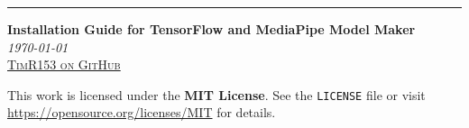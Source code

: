 \documentclass[12pt,a4paper]{article}
\begin{document}
\begin{titlepage} 
	
	\raggedleft 
	
	\rule{1pt}{\textheight}
	\hspace{0.05\textwidth}
  \parbox[b]{0.75\textwidth}{
    {\raggedright
      {\Huge\bfseries \nohyphens{Installation Guide for TensorFlow and MediaPipe Model Maker}}\\[2\baselineskip]
      {\large\textit{\today}}\\[4\baselineskip]
      {\Large\textsc{\href{https://github.com/TimR153}{TimR153 on GitHub}}}
      
      \vspace{0.5\textheight}
      
      {\noindent This work is licensed under the \textbf{MIT License}.  
      See the \texttt{LICENSE} file or visit \url{https://opensource.org/licenses/MIT} for details.}\\[\baselineskip]
    }
  }

\end{titlepage}
\thispagestyle{empty}
\tableofcontents
\thispagestyle{empty}
\newpage

\end{document}
